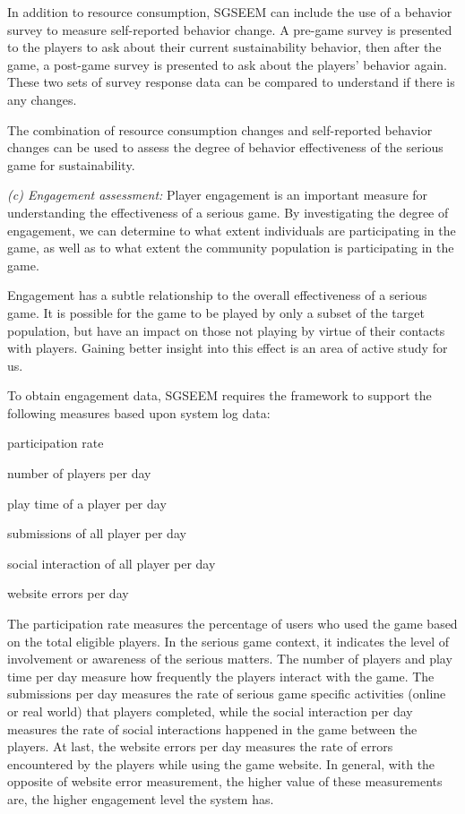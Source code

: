 \documentclass{sigchi}
\begin{document}
In addition to resource consumption, SGSEEM can include the use of a
behavior survey to measure self-reported behavior
change. A pre-game survey is presented to the players to ask about
their current sustainability behavior, then after the game, a post-game
survey is presented to ask about the players' behavior again. These two
sets of survey response data can be compared to understand if there is
any changes.

The combination of resource consumption changes and self-reported
behavior changes can be used to assess the degree of behavior
effectiveness of the serious game for sustainability.

\emph {(c) Engagement assessment:} Player engagement is an important measure for
understanding the effectiveness of a serious game. By investigating the degree of
engagement, we can determine to what extent individuals are participating in the game, as
well as to what extent the community population is participating in the game.


Engagement has a subtle relationship to the overall effectiveness of a serious game. It is
possible for the game to be played by only a subset of the target population, but
have an impact on those not playing by virtue of their contacts with players. Gaining
better insight into this effect is an area of active study for us. 

To obtain engagement data, SGSEEM requires the framework to support the following measures
based upon system log data: 

\begin{compactitem}
\item participation rate
\item number of players per day
\item play time of a player per day
\item submissions of all player per day
\item social interaction of all player per day
\item website errors per day
\end{compactitem}

The participation rate measures the percentage of users who used the game based on the total
eligible players. In the serious game context, it indicates the level of involvement or awareness
of the serious matters. The number of players and play time per day measure how frequently the
players interact with the game. The submissions per day measures the rate of serious game
specific activities (online or real world) that players completed, while the social interaction
per day measures the rate of social interactions happened in the game between the players. At
last, the website errors per day measures the rate of errors encountered by the players while
using the game website. In general, with the opposite of website error measurement, the higher
value of these measurements are, the higher engagement level the system has.
\end{document}
